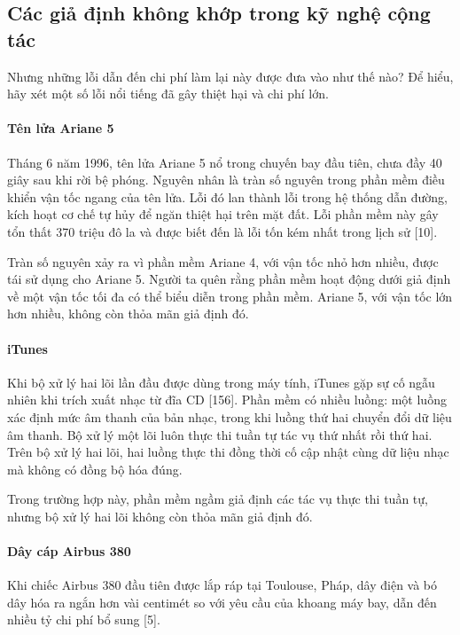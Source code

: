 \subsection{Các giả định không khớp trong kỹ nghệ cộng tác}
Nhưng những lỗi dẫn đến chi phí làm lại này được đưa vào như thế nào? Để hiểu, hãy xét một số lỗi nổi tiếng đã gây thiệt hại và chi phí lớn.

\paragraph*{Tên lửa Ariane 5}
Tháng 6 năm 1996, tên lửa Ariane 5 nổ trong chuyến bay đầu tiên, chưa đầy 40 giây sau khi rời bệ phóng. Nguyên nhân là tràn số nguyên trong phần mềm điều khiển vận tốc ngang của tên lửa. Lỗi đó lan thành lỗi trong hệ thống dẫn đường, kích hoạt cơ chế tự hủy để ngăn thiệt hại trên mặt đất. Lỗi phần mềm này gây tổn thất 370 triệu đô la và được biết đến là lỗi tốn kém nhất trong lịch sử [10].

Tràn số nguyên xảy ra vì phần mềm Ariane 4, với vận tốc nhỏ hơn nhiều, được tái sử dụng cho Ariane 5. Người ta quên rằng phần mềm hoạt động dưới giả định về một vận tốc tối đa
có thể biểu diễn trong phần mềm. Ariane 5, với vận tốc lớn hơn nhiều, không còn thỏa mãn giả định đó.

\paragraph*{iTunes}
Khi bộ xử lý hai lõi lần đầu được dùng trong máy tính, iTunes gặp sự cố ngẫu nhiên khi trích xuất nhạc từ đĩa CD [156]. Phần mềm có nhiều luồng: một luồng xác định mức âm thanh của bản nhạc, trong khi luồng thứ hai chuyển đổi dữ liệu âm thanh. Bộ xử lý một lõi luôn thực thi tuần tự tác vụ thứ nhất rồi thứ hai. Trên bộ xử lý hai lõi, hai luồng thực thi đồng thời cố cập nhật cùng dữ liệu nhạc mà không có đồng bộ hóa đúng.

Trong trường hợp này, phần mềm ngầm giả định các tác vụ thực thi tuần tự, nhưng bộ xử lý hai lõi không còn thỏa mãn giả định đó.

\paragraph*{Dây cáp Airbus 380}
Khi chiếc Airbus 380 đầu tiên được lắp ráp tại Toulouse, Pháp, dây điện và bó dây hóa ra ngắn hơn vài centimét so với yêu cầu của khoang máy bay, dẫn đến nhiều tỷ chi phí bổ sung [5].


